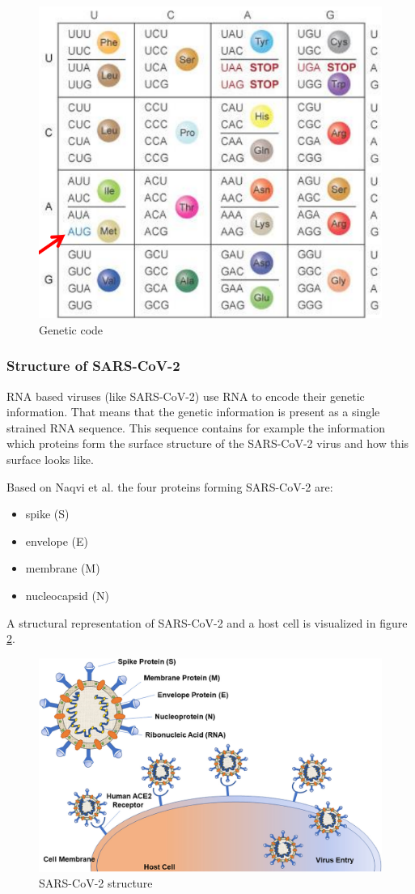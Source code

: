 \begin{figure}[ht]
	\centering
	\includegraphics[width=0.4\linewidth]{figures/geneticCode.png}
	\caption{Genetic code \cite{schererStatisticalGeneticsGenetic2021}}
	\label{genetic_code}
\end{figure}

\subsubsection{Structure of \ac{SARS-CoV-2}} \label{fundamentalsA0c}

\ac{RNA} based viruses (like \ac{SARS-CoV-2}) use \ac{RNA} to encode their genetic information. That means that the genetic information is present as a single strained \ac{RNA} sequence. This sequence contains for example the information which proteins form the surface structure of the SARS-CoV-2 virus and how this surface looks like. \cite{NAQVI2020165878}

Based on Naqvi et al. \cite{NAQVI2020165878} the four proteins forming \ac{SARS-CoV-2} are:
\begin{itemize}
	\item spike (S)
	\item envelope (E)
	\item membrane (M)
	\item nucleocapsid (N)
\end{itemize}

A structural representation of \ac{SARS-CoV-2} and a host cell is visualized in figure \ref{sarscov2_structure}. \cite{NAQVI2020165878}

\begin{figure}[ht]
	\centering
	\includegraphics[width=0.8\linewidth]{figures/SARS-CoV-2Structure.jpg}
	\caption{SARS-CoV-2 structure \cite{NAQVI2020165878}}
	\label{sarscov2_structure}
\end{figure}

